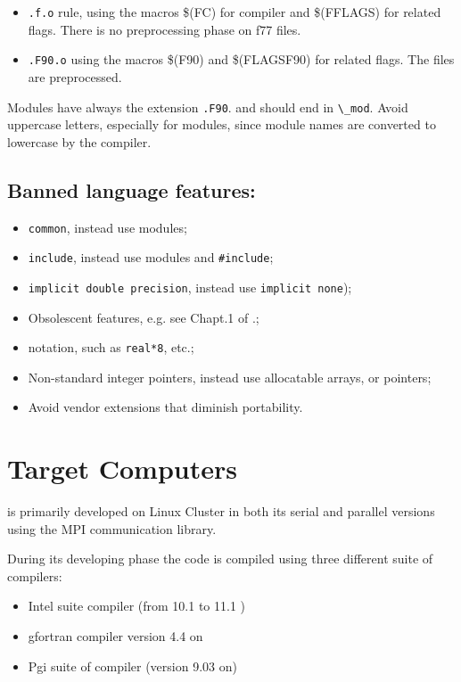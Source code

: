  \begin{itemize}
 \item
  \verb=.f.o= rule, using the macros {\macro \$(FC)} for compiler and 
{\macro \$(FFLAGS)} for related flags. There is no preprocessing phase on
 f77 files.
 \item
  \verb=.F90.o=  using the macros {\macro \$(F90)} and 
{\macro \$(FLAGSF90)} for related flags. The files are preprocessed.
 \end{itemize}

Modules have always the extension \verb=.F90=. and should end in \verb=\_mod=.
Avoid uppercase letters, especially for modules, since module names
are converted to lowercase by the compiler.
 
\subsection{ Banned \oldfort language features:}

 \begin{itemize}
 \item {\tt common}, instead use modules;
 \item {\tt include}, instead use modules and \verb=#include=;
 \item {\tt implicit double precision}, instead use {\tt implicit none});
 \item  Obsolescent \oldfort features, e.g. see Chapt.1 of \cite{Kerrigan}.;
 \item \oldfort notation, such as \verb=real*8=, etc.;
 \item  Non-standard \oldfort integer pointers, instead use allocatable
   arrays, or \fort pointers;
 \item  Avoid vendor extensions that diminish portability.
 \end{itemize}


\section{Target Computers}

\PR is primarily developed on Linux Cluster in both its serial and parallel versions using the MPI communication library. 

During its developing phase the code is compiled using three different suite of compilers:

\begin{itemize}
\item Intel suite compiler (from 10.1 to 11.1 )
\item gfortran compiler  version 4.4 on 
\item Pgi suite of compiler (version 9.03 on) 
\end{itemize}

